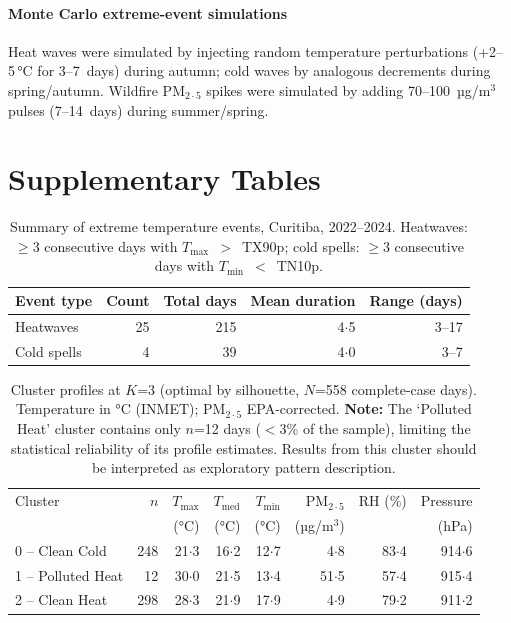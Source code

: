 \documentclass[12pt]{article}
\begin{document}
\paragraph{Monte Carlo extreme-event simulations}
Heat waves were simulated by injecting random temperature perturbations
(+2--5\,°C for 3--7~days) during autumn; cold waves by analogous
decrements during spring/autumn. Wildfire $\text{PM}_{2{\cdot}5}$ spikes were
simulated by adding 70--100~µg/m$^3$ pulses (7--14~days) during
summer/spring.

\clearpage
\section*{Supplementary Tables}

\begin{table}[ht]
\centering
\caption{Summary of extreme temperature events, Curitiba, 2022--2024.
Heatwaves: $\geq$3 consecutive days with $T_\mathrm{max}$~$>$~TX90p;
cold spells: $\geq$3 consecutive days with $T_\mathrm{min}$~$<$~TN10p.}
\label{etab:extreme_events}
\begin{tabular}{lrrrr}
\toprule
Event type & Count & Total days & Mean duration & Range (days) \\
\midrule
Heatwaves    & 25 & 215 & 4${\cdot}$5 & 3--17 \\
Cold spells  &  4 &  39 & 4${\cdot}$0 & 3--7 \\
\bottomrule
\end{tabular}
\end{table}

\begin{table}[ht]
\centering
\caption{Cluster profiles at $K$=3 (optimal by silhouette, $N$=558
complete-case days). Temperature in °C (INMET); $\text{PM}_{2{\cdot}5}$
EPA-corrected. \textbf{Note:} The `Polluted Heat' cluster contains only
$n$=12 days ($<$3\% of the sample), limiting the statistical
reliability of its profile estimates. Results from this cluster should
be interpreted as exploratory pattern description.}
\label{etab:clusters_k3}
\begin{tabular}{lrrrrrrr}
\toprule
Cluster & $n$ & $T_\mathrm{max}$ & $T_\mathrm{med}$ &
  $T_\mathrm{min}$ & $\text{PM}_{2{\cdot}5}$ & RH (\%) & Pressure \\
  & & (°C) & (°C) & (°C) & (µg/m$^3$) & & (hPa) \\
\midrule
0 -- Clean Cold     & 248 & 21${\cdot}$3 & 16${\cdot}$2 & 12${\cdot}$7 &  4${\cdot}$8 & 83${\cdot}$4 & 914${\cdot}$6 \\
1 -- Polluted Heat  &  12 & 30${\cdot}$0 & 21${\cdot}$5 & 13${\cdot}$4 & 51${\cdot}$5 & 57${\cdot}$4 & 915${\cdot}$4 \\
2 -- Clean Heat     & 298 & 28${\cdot}$3 & 21${\cdot}$9 & 17${\cdot}$9 &  4${\cdot}$9 & 79${\cdot}$2 & 911${\cdot}$2 \\
\bottomrule
\end{tabular}
\end{table}
\end{document}
